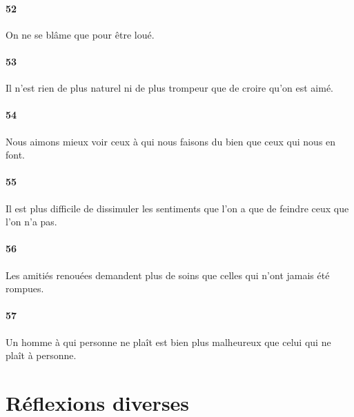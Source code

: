 \documentclass[french,twoside]{book} %
\begin{document}
\paragraph[{52}]{ \textsc{52} }
\noindent On ne se blâme que pour être loué.
\paragraph[{53}]{ \textsc{53} }
\noindent Il n’est rien de plus naturel ni de plus trompeur que de croire qu’on est aimé.
\paragraph[{54}]{ \textsc{54} }
\noindent Nous aimons mieux voir ceux à qui nous faisons du bien que ceux qui nous en font.
\paragraph[{55}]{ \textsc{55} }
\noindent Il est plus difficile de dissimuler les sentiments que l’on a que de feindre ceux que l’on n’a pas.
\paragraph[{56}]{ \textsc{56} }
\noindent Les amitiés renouées demandent plus de soins que celles qui n’ont jamais été rompues.
\paragraph[{57}]{ \textsc{57} }
\noindent Un homme à qui personne ne plaît est bien plus malheureux que celui qui ne plaît à personne.
\section[{Réflexions diverses}]{Réflexions diverses}\renewcommand{\leftmark}{Réflexions diverses}
\end{document}
